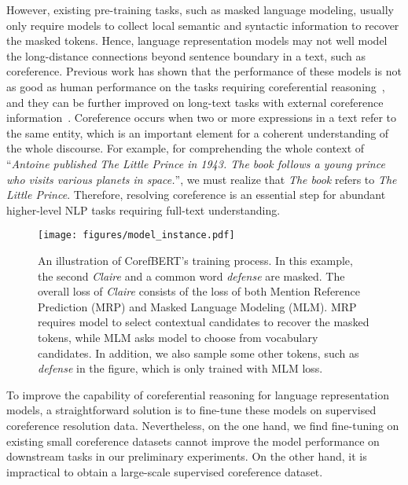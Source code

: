 \documentclass[11pt,a4paper]{article}
\begin{document}
However, existing pre-training tasks, such as masked language modeling, usually only require models to collect local semantic and syntactic information to recover the masked tokens. Hence, language representation models may not well model the long-distance connections beyond sentence boundary in a text, such as coreference. Previous work has shown that the performance of these models is not as good as human performance on the tasks requiring coreferential reasoning~\citep{Lambada, QUOREF}, and they can be further improved on long-text tasks with external coreference information~\citep{Coreflambada,CorefSummary, Transformer-XH}. Coreference occurs when two or more expressions in a text refer to the same entity, which is an important element for a coherent understanding of the whole discourse. For example, for comprehending the whole context of ``\emph{Antoine published The Little Prince in 1943. The book follows a young prince who visits various planets in space.}'', we must realize that \emph{The book} refers to \emph{The Little Prince}. Therefore, resolving coreference is an essential step for abundant higher-level NLP tasks requiring full-text understanding.



















\begin{figure*}
    \centering
    \texttt{[image: figures/model\_instance.pdf]}
    \caption{An illustration of CorefBERT's  training process. In this example, the second \emph{Claire} and a common word \emph{defense} are masked. The overall loss of \emph{Claire} consists of the loss of both Mention Reference Prediction (MRP) and Masked Language Modeling (MLM). MRP requires model to select contextual candidates to recover the masked tokens, while MLM asks model to choose from vocabulary candidates. In addition, we also sample some other tokens, such as \emph{defense} in the figure, which is only trained with MLM loss.}
    \label{fig:model}
\end{figure*}

To improve the capability of coreferential reasoning for language representation models, a straightforward solution is to fine-tune these models on supervised coreference resolution data. Nevertheless, on the one hand, we find fine-tuning on existing small coreference datasets cannot improve the model performance on downstream tasks in our preliminary experiments. On the other hand, it is impractical to obtain a large-scale supervised coreference dataset. 
\end{document}
